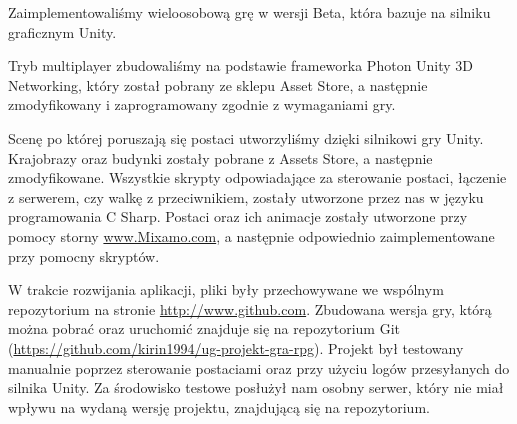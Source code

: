 Zaimplementowaliśmy wieloosobową grę w wersji Beta, która bazuje na silniku graficznym Unity.
 
Tryb multiplayer zbudowaliśmy na podstawie frameworka Photon Unity 3D Networking, który został pobrany ze sklepu Asset Store, a następnie zmodyfikowany i zaprogramowany zgodnie z wymaganiami gry.

Scenę po której poruszają się postaci utworzyliśmy dzięki silnikowi gry Unity.
Krajobrazy oraz budynki zostały pobrane z Assets Store, a następnie zmodyfikowane.
Wszystkie skrypty odpowiadające za sterowanie postaci, łączenie z serwerem, czy walkę z przeciwnikiem, zostały utworzone przez nas w języku programowania C Sharp.
Postaci oraz ich animacje zostały utworzone przy pomocy storny \url{www.Mixamo.com}, a następnie odpowiednio zaimplementowane przy pomocny skryptów.

W trakcie rozwijania aplikacji, pliki były przechowywane we wspólnym repozytorium na stronie \url{http://www.github.com}. Zbudowana wersja gry, którą można pobrać oraz uruchomić znajduje się na repozytorium Git (\url{https://github.com/kirin1994/ug-projekt-gra-rpg}).
Projekt był testowany manualnie poprzez sterowanie postaciami oraz przy użyciu logów przesyłanych do silnika Unity.
Za środowisko testowe posłużył nam osobny serwer, który nie miał wpływu na wydaną wersję projektu, znajdującą się na repozytorium.
